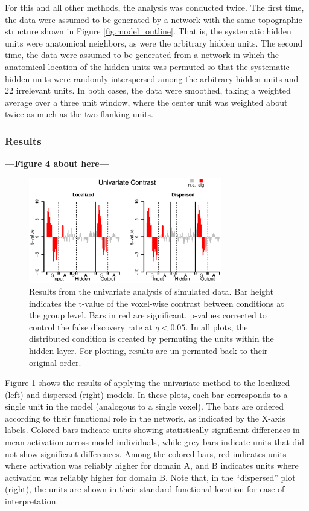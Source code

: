 For this and all other methods, the analysis was conducted twice. The first time, the data were assumed to be generated by a network with the same topographic structure shown in Figure \ref{fig.model_outline}. That is, the systematic hidden units were anatomical neighbors, as were the arbitrary hidden units. The second time, the data were assumed to be generated from a network in which the anatomical location of the hidden units was permuted so that the systematic hidden units were randomly interspersed among the arbitrary hidden units and 22 irrelevant units. In both cases, the data were smoothed, taking a weighted average over a three unit window, where the center unit was weighted about twice as much as the two flanking units.

\subsubsection{Results} 
\textbf{---Figure 4 about here---}
\begin{figure}
\centering
\includegraphics[width=0.75\textwidth]{figures/univariate.eps}
\caption{\label{fig.univariate} Results from the univariate analysis of simulated data. Bar height indicates the t-value of the voxel-wise contrast between conditions at the group level. Bars in red are significant, p-values corrected to control the false discovery rate at $q<0.05$. In all plots, the distributed condition is created by permuting the units within the hidden layer. For plotting, results are un-permuted back to their original order.}
\end{figure}

Figure \ref{fig.univariate} shows the results of applying the univariate method to the localized (left) and dispersed (right) models. In these plots, each bar corresponds to a single unit in the model (analogous to a single voxel). The bars are ordered according to their functional role in the network, as indicated by the X-axis labels. Colored bars indicate units showing statistically significant differences in mean activation across model individuals, while grey bars indicate units that did not show significant differences. Among the colored bars, red indicates units where activation was reliably higher for domain A, and B indicates units where activation was reliably higher for domain B. Note that, in the ``dispersed'' plot (right), the units are shown in their standard functional location for ease of interpretation.

